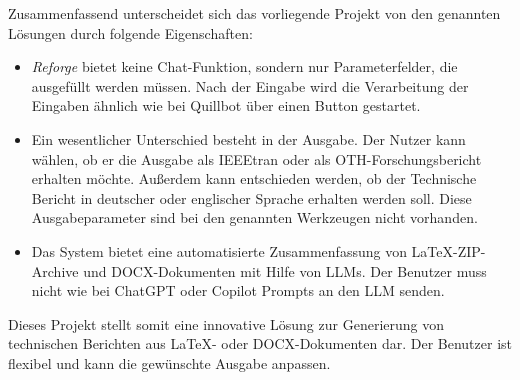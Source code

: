 Zusammenfassend unterscheidet sich das vorliegende Projekt von den genannten Lösungen durch folgende Eigenschaften:

\begin{itemize}
    \item \textit{Reforge} bietet keine Chat-Funktion, sondern nur Parameterfelder, die ausgefüllt werden müssen. Nach der Eingabe wird die Verarbeitung der Eingaben ähnlich wie bei Quillbot über einen Button gestartet.
    \item Ein wesentlicher Unterschied besteht in der Ausgabe. Der Nutzer kann wählen, ob er die Ausgabe als IEEEtran oder als OTH-Forschungsbericht erhalten möchte. Außerdem kann entschieden werden, ob der Technische Bericht in deutscher oder englischer Sprache erhalten werden soll. Diese Ausgabeparameter sind bei den genannten Werkzeugen nicht vorhanden.
    \item Das System bietet eine automatisierte Zusammenfassung von LaTeX-ZIP-Archive und \ac{DOCX}-Dokumenten mit Hilfe von \ac{LLM}s. Der Benutzer muss nicht wie bei ChatGPT oder Copilot Prompts an den \ac{LLM} senden.
\end{itemize}

Dieses Projekt stellt somit eine innovative Lösung zur Generierung von technischen Berichten aus LaTeX- oder \ac{DOCX}-Dokumenten dar. Der Benutzer ist flexibel und kann die gewünschte Ausgabe anpassen.
